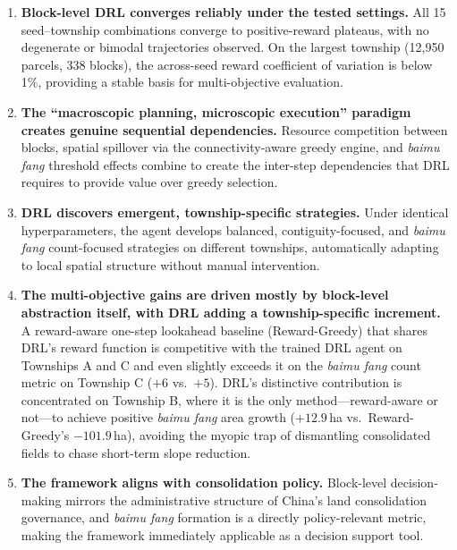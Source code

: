\documentclass[preprint,12pt]{elsarticle}
\begin{document}
\begin{enumerate}
\item \textbf{Block-level DRL converges reliably under the tested settings.} All 15 seed--township combinations converge to positive-reward plateaus, with no degenerate or bimodal trajectories observed. On the largest township (12{,}950 parcels, 338 blocks), the across-seed reward coefficient of variation is below 1\%, providing a stable basis for multi-objective evaluation.

\item \textbf{The ``macroscopic planning, microscopic execution'' paradigm creates genuine sequential dependencies.} Resource competition between blocks, spatial spillover via the connectivity-aware greedy engine, and \textit{baimu fang} threshold effects combine to create the inter-step dependencies that DRL requires to provide value over greedy selection.

\item \textbf{DRL discovers emergent, township-specific strategies.} Under identical hyperparameters, the agent develops balanced, contiguity-focused, and \textit{baimu fang} count-focused strategies on different townships, automatically adapting to local spatial structure without manual intervention.

\item \textbf{The multi-objective gains are driven mostly by block-level abstraction itself, with DRL adding a township-specific increment.} A reward-aware one-step lookahead baseline (Reward-Greedy) that shares DRL's reward function is competitive with the trained DRL agent on Townships A and C and even slightly exceeds it on the \textit{baimu fang} count metric on Township C ($+6$ vs.\ $+5$). DRL's distinctive contribution is concentrated on Township B, where it is the only method---reward-aware or not---to achieve positive \textit{baimu fang} area growth ($+12.9$\,ha vs.\ Reward-Greedy's $-101.9$\,ha), avoiding the myopic trap of dismantling consolidated fields to chase short-term slope reduction.

\item \textbf{The framework aligns with consolidation policy.} Block-level decision-making mirrors the administrative structure of China's land consolidation governance, and \textit{baimu fang} formation is a directly policy-relevant metric, making the framework immediately applicable as a decision support tool.
\end{enumerate}
\end{document}
